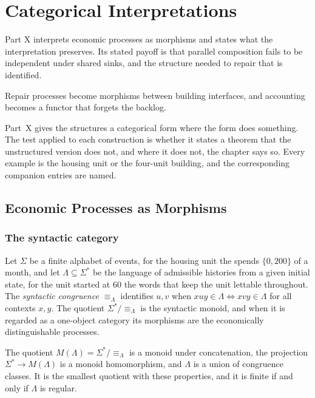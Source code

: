 \part{Categorical Interpretations}
\label{part:X}

Part X interprets economic processes as morphisms and states what the interpretation preserves. Its stated payoff is that parallel composition fails to be independent under shared sinks, and the structure needed to repair that is identified.

\begin{housing}Repair processes become morphisms between building interfaces, and accounting becomes a functor that forgets the backlog.\end{housing}


Part~X gives the structures a categorical form where the form does something. The test applied to each construction is whether it states a theorem that the unstructured version does not, and where it does not, the chapter says so. Every example is the housing unit or the four-unit building, and the corresponding companion entries are named.

\chapter{Economic Processes as Morphisms}\label{ch:46}

\section{The syntactic category}

Let $\Sigma$ be a finite alphabet of events, for the housing unit the spends $\{0,200\}$ of a month, and let $\Lambda\subseteq\Sigma^*$ be the language of admissible histories from a given initial state, for the unit started at $60$ the words that keep the unit lettable throughout. The \emph{syntactic congruence} $\equiv_\Lambda$ identifies $u,v$ when $xuy\in\Lambda\Leftrightarrow xvy\in\Lambda$ for all contexts $x,y$. The quotient $\Sigma^*/{\equiv_\Lambda}$ is the syntactic monoid, and when it is regarded as a one-object category its morphisms are the economically distinguishable processes.

\begin{proposition}\label{prop:syn}
The quotient $M(\Lambda)=\Sigma^*/{\equiv_\Lambda}$ is a monoid under concatenation, the projection $\Sigma^*\to M(\Lambda)$ is a monoid homomorphism, and $\Lambda$ is a union of congruence classes. It is the smallest quotient with these properties, and it is finite if and only if $\Lambda$ is regular.
\end{proposition}

